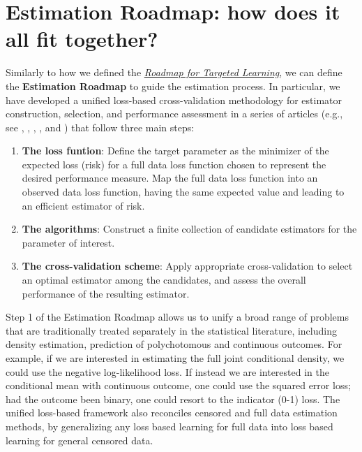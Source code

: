 \documentclass[12pt, krantz2,]{krantz}
\theoremstyle{definition}
\theoremstyle{definition}
\theoremstyle{definition}
\newcommand{\1}{\mathbbm{1}}
\begin{document}
\hypertarget{estimation-roadmap-how-does-it-all-fit-together}{%
\section{Estimation Roadmap: how does it all fit together?}\label{estimation-roadmap-how-does-it-all-fit-together}}

Similarly to how we defined the \protect\hyperlink{roadmap}{\emph{Roadmap for Targeted Learning}}, we
can define the \textbf{Estimation Roadmap} to guide the estimation process. In
particular, we have developed a unified loss-based cross-validation methodology
for estimator construction, selection, and performance assessment in a series of
articles (e.g., see \citet{vdl2003unified}, \citet{vdl2004asymptotic}, \citet{dudoit2005asymptotics},
\citet{vaart2006oracle}, and \citet{vdl2007super}) that follow three main steps:

\begin{enumerate}
\def\labelenumi{\arabic{enumi}.}
\item
  \textbf{The loss funtion}:
  Define the target parameter as the minimizer of the expected loss (risk) for a
  full data loss function chosen to represent the desired performance measure.
  Map the full data loss function into an observed data loss function, having the
  same expected value and leading to an efficient estimator of risk.
\item
  \textbf{The algorithms}:
  Construct a finite collection of candidate estimators for the parameter of
  interest.
\item
  \textbf{The cross-validation scheme}:
  Apply appropriate cross-validation to select an optimal estimator among the
  candidates, and assess the overall performance of the resulting estimator.
\end{enumerate}

Step 1 of the Estimation Roadmap allows us to unify a broad range of problems
that are traditionally treated separately in the statistical literature,
including density estimation, prediction of polychotomous and continuous
outcomes. For example, if we are interested in estimating the full joint
conditional density, we could use the negative log-likelihood loss. If instead
we are interested in the conditional mean with continuous outcome, one could use
the squared error loss; had the outcome been binary, one could resort to the
indicator (0-1) loss. The unified loss-based framework also reconciles censored
and full data estimation methods, by generalizing any loss based learning for
full data into loss based learning for general censored data.
\end{document}
